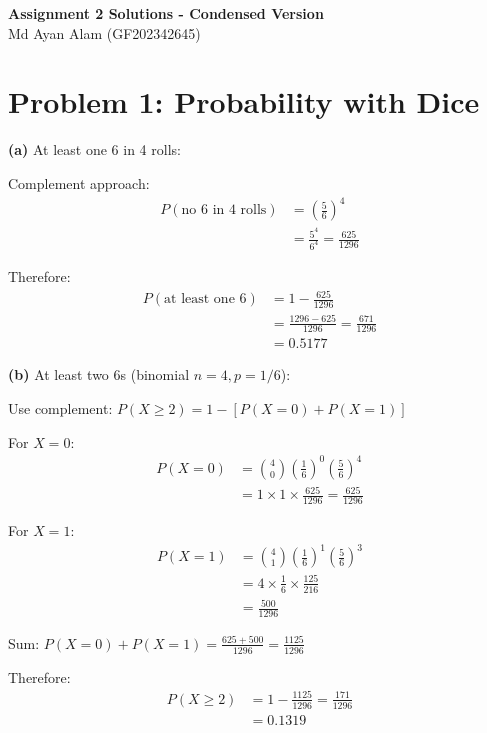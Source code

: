 \documentclass[10pt,twocolumn]{article}
\begin{document}
\begin{center}
\Large\textbf{Assignment 2 Solutions - Condensed Version}\\[4pt]
\normalsize Md Ayan Alam (GF202342645)
\end{center}

\vspace{-8pt}

\section*{Problem 1: Probability with Dice}

\textbf{(a)} At least one 6 in 4 rolls:

Complement approach:
\begin{align*}
P(\text{no 6 in 4 rolls}) &= \left(\frac{5}{6}\right)^4 \\
&= \frac{5^4}{6^4} = \frac{625}{1296}
\end{align*}

Therefore:
\begin{align*}
P(\text{at least one 6}) &= 1 - \frac{625}{1296} \\
&= \frac{1296-625}{1296} = \frac{671}{1296} \\
&= \boxed{0.5177}
\end{align*}

\textbf{(b)} At least two 6s (binomial $n=4, p=1/6$):

Use complement: $P(X \geq 2) = 1 - [P(X=0) + P(X=1)]$

For $X=0$:
\begin{align*}
P(X=0) &= \binom{4}{0}\left(\frac{1}{6}\right)^0\left(\frac{5}{6}\right)^4 \\
&= 1 \times 1 \times \frac{625}{1296} = \frac{625}{1296}
\end{align*}

For $X=1$:
\begin{align*}
P(X=1) &= \binom{4}{1}\left(\frac{1}{6}\right)^1\left(\frac{5}{6}\right)^3 \\
&= 4 \times \frac{1}{6} \times \frac{125}{216} \\
&= \frac{500}{1296}
\end{align*}

Sum: $P(X=0) + P(X=1) = \frac{625+500}{1296} = \frac{1125}{1296}$

Therefore:
\begin{align*}
P(X \geq 2) &= 1 - \frac{1125}{1296} = \frac{171}{1296} \\
&= \boxed{0.1319}
\end{align*}
\end{document}
